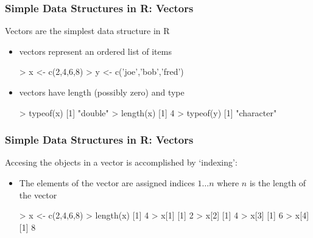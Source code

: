 \documentclass{beamer}
\begin{document}
\begin{frame}[fragile]
  \frametitle{Simple Data Structures in R: Vectors}

Vectors are the simplest data structure in R
\begin{itemize}
	\item vectors represent an ordered list of items
\begin{Rcode}
> x <- c(2,4,6,8)
> y <- c('joe','bob','fred')
\end{Rcode}

	\item vectors have length (possibly zero) and type
\begin{Rcode}
> typeof(x)
[1] "double"
> length(x)
[1] 4
> typeof(y)
[1] "character"
\end{Rcode}


\end{itemize}

\end{frame}

\begin{frame}[fragile]
  \frametitle{Simple Data Structures in R: Vectors}

Accesing the objects in a vector is accomplished by `indexing':
\begin{itemize}
	\item The elements of the vector are assigned indices $1 \ldots n$ where $n$ is the length of the vector

\begin{Rcode}
> x <- c(2,4,6,8)
> length(x)
[1] 4
> x[1]
[1] 2
> x[2]
[1] 4
> x[3]
[1] 6
> x[4]
[1] 8
\end{Rcode}


\end{itemize}

\end{frame}
\end{document}
